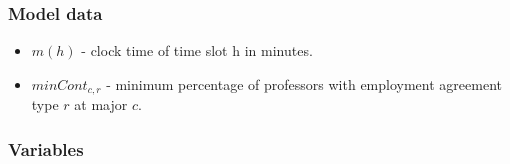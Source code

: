 
\subsubsection{Model data}
\begin{itemize}
\item $m(h)$ - clock time of time slot h in minutes.
\item $minCont_{c,r}$ - minimum percentage of professors with employment agreement type $r$ at major $c$.
\end{itemize}

\subsubsection{Variables}
